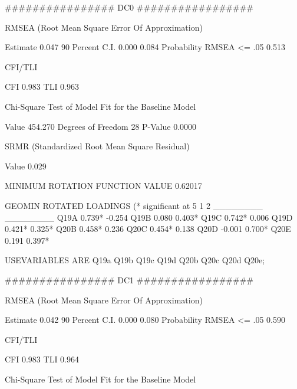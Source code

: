 
################
DC0
#################

RMSEA (Root Mean Square Error Of Approximation)

          Estimate                           0.047
          90 Percent C.I.                    0.000  0.084
          Probability RMSEA <= .05           0.513

CFI/TLI

          CFI                                0.983
          TLI                                0.963

Chi-Square Test of Model Fit for the Baseline Model

          Value                            454.270
          Degrees of Freedom                    28
          P-Value                           0.0000

SRMR (Standardized Root Mean Square Residual)

          Value                              0.029



MINIMUM ROTATION FUNCTION VALUE       0.62017



           GEOMIN ROTATED LOADINGS (* significant at 5%
                  1             2
              ________      ________
 Q19A           0.739*       -0.254
 Q19B           0.080         0.403*
 Q19C           0.742*        0.006
 Q19D           0.421*        0.325*
 Q20B           0.458*        0.236
 Q20C           0.454*        0.138
 Q20D          -0.001         0.700*
 Q20E           0.191         0.397*


 USEVARIABLES ARE  
Q19a Q19b Q19c Q19d 
Q20b Q20c Q20d Q20e;








################
DC1
#################





RMSEA (Root Mean Square Error Of Approximation)

          Estimate                           0.042
          90 Percent C.I.                    0.000  0.080
          Probability RMSEA <= .05           0.590

CFI/TLI

          CFI                                0.983
          TLI                                0.964

Chi-Square Test of Model Fit for the Baseline Model

